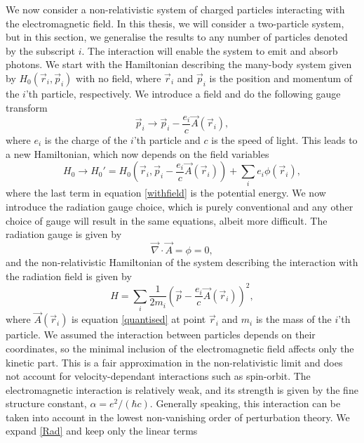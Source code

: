 We now consider a non-relativistic system of charged particles interacting with the electromagnetic field. In this thesis, we will consider a two-particle system, but in this section, we generalise the results to any number of particles denoted by the subscript $i$. The interaction will enable the system to emit and absorb photons. We start with the Hamiltonian describing the many-body system given by $H_0(\vec{r}_i,\vec{p}_i)$ with no field, where $\vec{r}_i$ and $\vec{p}_i$ is the position and momentum of the $i$'th particle, respectively. We introduce a field and do the following gauge transform 
\begin{equation} \label{substi}
	\vec{p}_i \rightarrow \vec{p}_i - \frac{e_i}{c}\vec{A}(\vec{r}_i),
\end{equation}
where $e_i$ is the charge of the $i$'th particle and $c$ is the speed of light. This leads to a new Hamiltonian, which now depends on the field variables
\begin{equation} \label{withfield}
	H_0 \rightarrow H_0' = H_0 \left( \vec{r}_i,\vec{p}_i-\frac{e_i}{c}\vec{A}(\vec{r}_i)\right) + \sum_i e_i \phi(\vec{r}_i),
\end{equation}
where the last term in equation \eqref{withfield} is the potential energy. We now introduce the radiation gauge choice, which is purely conventional and any other choice of gauge will result in the same equations, albeit more difficult. The radiation gauge \cite{Jackson} is given by 
\begin{equation} \label{RadiationGauge}
	\vec{\nabla}\cdot \vec{A} = \phi = 0,
\end{equation}
and the non-relativistic Hamiltonian of the system describing the interaction with the radiation field is given by
\begin{equation} \label{Rad}
	H = \sum_i \frac{1}{2m_i}\left( \vec{p}-\frac{e_i}{c}\vec{A}(\vec{r}_i)\right)^2,
\end{equation}
where $\vec{A}(\vec{r}_i)$ is equation \eqref{quantised} at point $\vec{r}_i$ and $m_i$ is the mass of the $i$'th particle. We assumed the interaction between particles depends on their coordinates, so the minimal inclusion of the electromagnetic field affects only the kinetic part. This is a fair approximation in the non-relativistic limit and does not account for velocity-dependant interactions such as spin-orbit.
The electromagnetic interaction is relatively weak, and its strength is given by the fine structure constant, $\alpha = e^2/(\hbar c)$. Generally speaking, this interaction can be taken into account in the lowest non-vanishing order of perturbation theory. We expand \eqref{Rad} and keep only the linear terms
